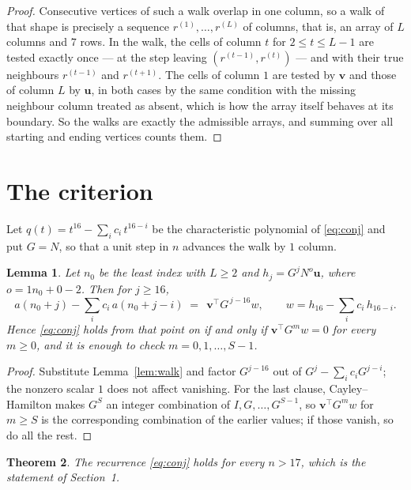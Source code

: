 \documentclass[11pt,a4paper]{article}
\theoremstyle{plain}
\newtheorem{theorem}{Theorem}
\newtheorem{lemma}[theorem]{Lemma}
\theoremstyle{definition}
\begin{document}
\begin{proof}
Consecutive vertices of such a walk overlap in one column, so a walk of that shape is
precisely a sequence $r^{(1)},\dots,r^{(L)}$ of columns, that is, an array of $L$ columns
and $7$ rows. In the walk, the cells of column $t$ for $2\le t\le L-1$ are tested
exactly once --- at the step leaving $(r^{(t-1)},r^{(t)})$ --- and with their true
neighbours $r^{(t-1)}$ and $r^{(t+1)}$. The cells of column $1$ are tested by
$\mathbf{v}$ and those of column $L$ by $\mathbf{u}$, in both cases by the same condition
with the missing neighbour column treated as absent, which is how the array itself behaves at
its boundary. So the walks are exactly the admissible arrays, and summing over all starting
and ending vertices counts them.
\end{proof}

\section{The criterion}

Let $q(t)=t^{16}-\sum_i c_i\,t^{16-i}$ be the characteristic polynomial of
\eqref{eq:conj} and put $G=N$, so that a unit step in $n$ advances the walk by
$1$ column.

\begin{lemma}\label{lem:crit}
Let $n_0$ be the least index with $L\ge2$ and $h_j=G^{j}N^{o}\mathbf{u}$, where
$o=1n_0+0-2$. Then for $j\ge16$,
\[
a(n_0+j)-\sum_i c_i\,a(n_0+j-i)\;=\;\,\mathbf{v}^{\!\top}G^{\,j-16}w,
\qquad w=h_{16}-\sum_i c_i\,h_{16-i} .
\]
Hence \eqref{eq:conj} holds from that point on if and only if
$\mathbf{v}^{\!\top}G^{m}w=0$ for every $m\ge0$, and it is enough to check
$m=0,1,\dots,S-1$.
\end{lemma}

\begin{proof}
Substitute Lemma~\ref{lem:walk} and factor $G^{j-16}$ out of
$G^{j}-\sum_ic_iG^{j-i}$; the nonzero scalar $1$ does not affect
vanishing. For the last clause, Cayley--Hamilton makes $G^{S}$ an integer combination of
$I,G,\dots,G^{S-1}$, so $\mathbf{v}^{\!\top}G^{m}w$ for $m\ge S$ is the corresponding
combination of the earlier values; if those vanish, so do all the rest.
\end{proof}

\begin{theorem}
The recurrence \eqref{eq:conj} holds for every $n>17$, which is the statement of
Section~1.
\end{theorem}
\end{document}
